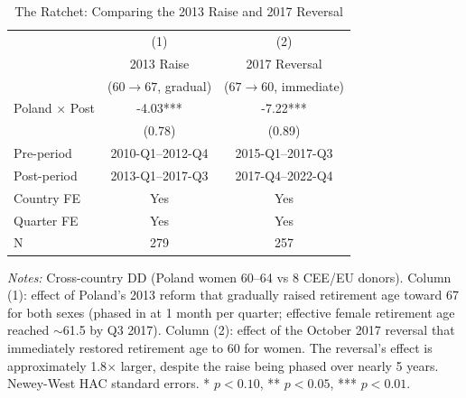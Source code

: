 \begin{table}[H]
\centering
\caption{The Ratchet: Comparing the 2013 Raise and 2017 Reversal}
\label{tab:asymmetry}
\begin{threeparttable}
\begin{tabular}{lcc}
\toprule
 & (1) & (2) \\
 & 2013 Raise & 2017 Reversal \\
 & ($60 \rightarrow 67$, gradual) & ($67 \rightarrow 60$, immediate) \\
\midrule
Poland $\times$ Post & -4.03*** & -7.22*** \\
 & (0.78) & (0.89) \\
[0.3em]
Pre-period & 2010-Q1--2012-Q4 & 2015-Q1--2017-Q3 \\
Post-period & 2013-Q1--2017-Q3 & 2017-Q4--2022-Q4 \\
Country FE & Yes & Yes \\
Quarter FE & Yes & Yes \\
N & 279 & 257 \\
\bottomrule
\end{tabular}
\begin{tablenotes}[flushleft]
\small
\item \textit{Notes:} Cross-country DD (Poland women 60--64 vs 8 CEE/EU donors). Column (1): effect of Poland's 2013 reform that gradually raised retirement age toward 67 for both sexes (phased in at 1 month per quarter; effective female retirement age reached $\sim$61.5 by Q3 2017). Column (2): effect of the October 2017 reversal that immediately restored retirement age to 60 for women. The reversal's effect is approximately 1.8$\times$ larger, despite the raise being phased over nearly 5 years. Newey-West HAC standard errors. * $p<0.10$, ** $p<0.05$, *** $p<0.01$.
\end{tablenotes}
\end{threeparttable}
\end{table}
